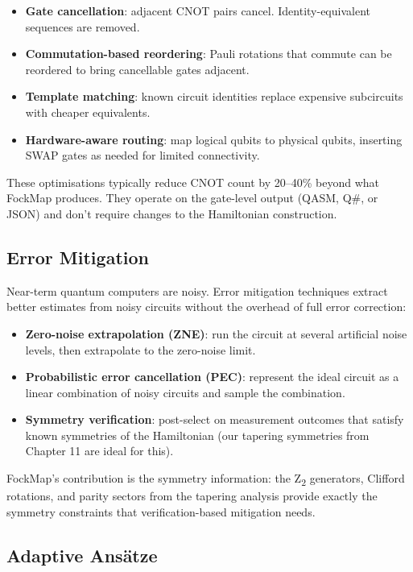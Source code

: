 \documentclass[
  11pt,
  oneside]{book}
\providecommand{\tightlist}{%
  \setlength{\itemsep}{0pt}\setlength{\parskip}{0pt}}
\begin{document}
\begin{itemize}
\tightlist
\item
  \textbf{Gate cancellation}: adjacent CNOT pairs cancel.
  Identity-equivalent sequences are removed.
\item
  \textbf{Commutation-based reordering}: Pauli rotations that commute
  can be reordered to bring cancellable gates adjacent.
\item
  \textbf{Template matching}: known circuit identities replace expensive
  subcircuits with cheaper equivalents.
\item
  \textbf{Hardware-aware routing}: map logical qubits to physical
  qubits, inserting SWAP gates as needed for limited connectivity.
\end{itemize}

These optimisations typically reduce CNOT count by 20--40\% beyond what
FockMap produces. They operate on the gate-level output (QASM, Q\#, or
JSON) and don't require changes to the Hamiltonian construction.

\subsection{Error Mitigation}\label{error-mitigation}

Near-term quantum computers are noisy. Error mitigation techniques
extract better estimates from noisy circuits without the overhead of
full error correction:

\begin{itemize}
\tightlist
\item
  \textbf{Zero-noise extrapolation (ZNE)}: run the circuit at several
  artificial noise levels, then extrapolate to the zero-noise limit.
\item
  \textbf{Probabilistic error cancellation (PEC)}: represent the ideal
  circuit as a linear combination of noisy circuits and sample the
  combination.
\item
  \textbf{Symmetry verification}: post-select on measurement outcomes
  that satisfy known symmetries of the Hamiltonian (our tapering
  symmetries from Chapter 11 are ideal for this).
\end{itemize}

FockMap's contribution is the symmetry information: the Z\textsubscript{2} generators,
Clifford rotations, and parity sectors from the tapering analysis
provide exactly the symmetry constraints that verification-based
mitigation needs.

\subsection{Adaptive Ansätze}\label{adaptive-ansuxe4tze}
\end{document}
